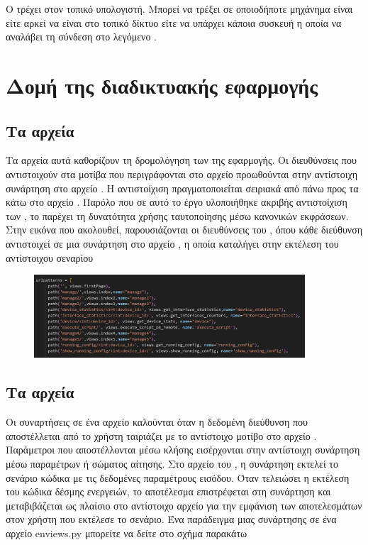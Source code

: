 Ο  τρέχει στον τοπικό υπολογιστή. Μπορεί να τρέξει σε οποιοδήποτε
μηχάνημα είναι  είτε  αρκεί να είναι στο τοπικό δίκτυο
είτε να υπάρχει κάποια συσκευή  η οποία να αναλάβει τη σύνδεση στο λεγόμενο
.


\section{Δομή της διαδικτυακής εφαρμογής  }


\subsection{Τα αρχεία }
Τα αρχεία αυτά καθορίζουν τη δρομολόγηση των  της εφαρμογής. 
Οι διευθύνσεις  που αντιστοιχούν στα μοτίβα που περιγράφονται στο αρχείο  
προωθούνται στην αντίστοιχη συνάρτηση στο αρχείο . 
Η αντιστοίχιση πραγματοποιείται σειριακά από πάνω προς τα κάτω στο αρχείο . 
Παρόλο που σε αυτό το έργο υλοποιήθηκε ακριβής αντιστοίχιση των , το  παρέχει τη 
δυνατότητα χρήσης ταυτοποίησης μέσω κανονικών εκφράσεων. Στην εικόνα που ακολουθεί, παρουσιάζονται οι 
διευθύνσεις  του , όπου κάθε διεύθυνση αντιστοιχεί σε μια συνάρτηση στο αρχείο , 
η οποία καταλήγει στην εκτέλεση του αντίστοιχου σεναρίου

\begin{figure}[htb]
	\centering
	\includegraphics[width=0.9\textwidth]{graphics/urlpy.png}
	\caption{ }
\end{figure}

\subsection{Τα αρχεία }

Οι συναρτήσεις σε ένα αρχείο  καλούνται όταν η δεδομένη διεύθυνση  που αποστέλλεται από το
χρήστη ταιριάζει με το αντίστοιχο μοτίβο  στο αρχείο . Παράμετροι που αποστέλλονται μέσω κλήσης
 εισέρχονται στην αντίστοιχη συνάρτηση μέσω παραμέτρων ή σώματος αίτησης. Στο αρχείο  του , η συνάρτηση εκτελεί το σενάριο
κώδικα με τις δεδομένες παραμέτρους εισόδου. Όταν τελειώσει η εκτέλεση του κώδικα δέσμης ενεργειών,
το αποτέλεσμα επιστρέφεται στη συνάρτηση  και μεταβιβάζεται ως πλαίσιο στο αντίστοιχο αρχείο  για την εμφάνιση των αποτελεσμάτων στον χρήστη που εκτέλεσε το σενάριο.
Ένα παράδειγμα μιας συνάρτησης σε ένα αρχείο en{views.py} μπορείτε να δείτε στο σχήμα παρακάτω

